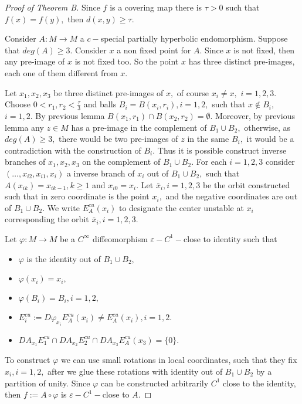 \documentclass[12pt,reqno]{amsart}
\numberwithin{equation}{section}
\theoremstyle{plain}
\theoremstyle{remark}
\begin{document}
\begin{proof}[Proof of Theorem B] Since $f$ is a covering map there is $\tau > 0$ such that $f(x) = f(y),$ then $d(x, y) \geq \tau.$

Consider $A: M \rightarrow M$ a $c-$special partially hyperbolic endomorphism. Suppose that $deg(A)\geq 3.$ Consider $x$ a non fixed point for $A.$ Since $x$ is not fixed, then any pre-image of $x$ is not fixed too. So the point $x$ has three distinct pre-images, each one of them different from $x.$

Let $x_1, x_2, x_3$ be three distinct pre-images of $x,$ of course  $x_i \neq x,$ $i =1,2,3.$ Choose $0 < r_1, r_2 < \frac{\tau}{3}$ and balls $B_i = B(x_i, r_i), i = 1,2,$ such that $x \notin B_i,$ $ i =1,2.$ By previous lemma $B(x_1, r_1) \cap B(x_2, r_2) = \emptyset.$  Moreover, by previous lemma any $z \in M$ has a pre-image in the complement of $B_1 \cup B_2,$ otherwise, as $deg(A) \geq 3,$ there would be two pre-images of $z$ in the same $B_i,$ it would be a contradiction with the construction of $B_i.$  Thus it is possible construct inverse branches of $x_1, x_2, x_3$ on the complement of  $B_1 \cup B_2.$  For each $i = 1,2,3$ consider $( \ldots, x_{i2}, x_{i1}, x_i)$ a inverse branch of $x_i$ out of $B_1 \cup B_2,$ such that $A(x_{ik}) = x_{ik-1}, k \geq 1$ and $x_{i0} = x_i.$ Let $\bar{x}_i, i=1,2,3$ be the orbit constructed such that in zero coordinate is the point $x_i,$ and the negative coordinates are out of $B_1 \cup B_2.$ We write $E^{cu}_A(x_i)$ to designate the center unstable at $x_i$ corresponding the orbit $\bar{x}_i, i =1,2,3.$


Let $\varphi: M \rightarrow M $ be a $C^{\infty} $ diffeomorphism $\varepsilon-C^1-$close to identity such that

\begin{itemize}
\item $\varphi$ is the identity out of $B_1 \cup B_2,$
\item $\varphi(x_i) = x_i,$
\item $\varphi(B_i) = B_i, i=1,2,$
\item $E^{cu}_i:= D\varphi_{x_i} E^{cu}_A(x_i) \neq E^{cu}_A(x_i), i =1,2.$
\item $DA_{x_1} E^{cu}_1 \cap DA_{x_2}E^{cu}_2 \cap DA_{x_3}E^{cu}_A(x_3)  = \{0\}.$
\end{itemize}

To construct $\varphi$ we can use small rotations in local coordinates, such that they fix $x_i, i=1,2,$ after we glue these rotations with identity out of $B_1 \cup B_2$ by a partition of unity.  Since $\varphi$ can be constructed arbitrarily $C^1$ close to the identity, then $f := A \circ \varphi$ is $\varepsilon-C^1-$close to $A.$



\end{proof}
\end{document}
